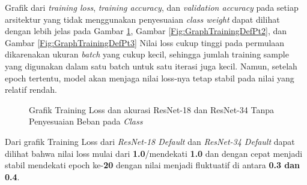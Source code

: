 Grafik dari \emph{training loss}, \emph{training accuracy}, dan \emph{validation accuracy} pada setiap arsitektur yang tidak menggunakan penyesuaian \emph{class weight} dapat dilihat dengan lebih jelas pada Gambar \ref{Fig:GraphTrainingDefPt1}, Gambar \ref{Fig:GraphTrainingDefPt2}, dan Gambar \ref{Fig:GraphTrainingDefPt3} Nilai loss cukup tinggi pada permulaan dikarenakan ukuran \emph{batch} yang cukup kecil, sehingga jumlah training sample yang digunakan dalam satu batch untuk satu iterasi juga kecil. Namun, setelah epoch tertentu, model akan menjaga nilai loss-nya tetap stabil pada nilai yang relatif rendah.
\pagebreak
\begin{figure}[hbtp]
	\centering
	\qquad
	\caption{Grafik Training Loss dan akurasi ResNet-18 dan ResNet-34 Tanpa Penyesuaian Beban pada \emph{Class}}
	\label{Fig:GraphTrainingDefPt1}
\end{figure}

Dari grafik Training Loss dari \emph{ResNet-18 Default} dan \emph{ResNet-34 Default}  dapat dilihat bahwa nilai loss mulai dari \textbf{1.0}/mendekati \textbf{1.0} dan dengan cepat menjadi stabil mendekati epoch ke-\textbf{20} dengan nilai menjadi fluktuatif di antara \textbf{0.3 dan 0.4}.

